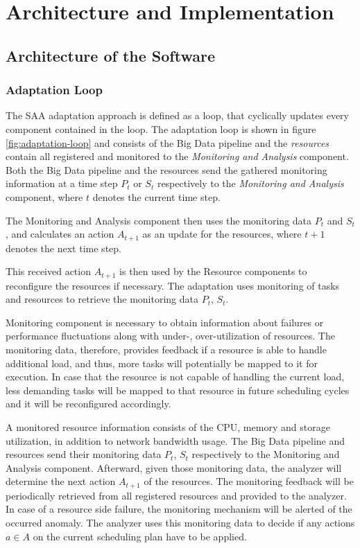 \chapter{Architecture and Implementation}
\label{ch:architecture-and-implementation}

\section{Architecture of the Software}

  \subsection{Adaptation Loop}


  The SAA adaptation approach is defined as a loop, that cyclically updates every component contained in the loop.
  The adaptation loop is shown in figure \ref{fig:adaptation-loop} and consists of the Big Data pipeline and the \emph{resources} contain all registered and monitored to the \emph{Monitoring and Analysis} component. 
  Both the Big Data pipeline and the resources send the gathered monitoring information at a time step $P_t$ or $S_t$ respectively to the \emph{Monitoring and Analysis} component, where $t$ denotes the current time step.

  The Monitoring and Analysis component then uses the monitoring data $P_t$ and $S_t$, and calculates an action $A_{t+1}$ as an update for the resources, where $t+1$ denotes the next time step.
  
  This received action $A_{t+1}$ is then used by the Resource components to reconfigure the resources if necessary.
  The adaptation uses monitoring of tasks and resources to retrieve the monitoring data $P_t$, $S_t$.
  
  Monitoring component is necessary to obtain information about failures or performance fluctuations along with under-, over-utilization of resources.
  The monitoring data, therefore, provides feedback if a resource is able to handle additional load, and thus, more tasks will potentially be mapped to it for execution. 
  In case that the resource is not capable of handling the current load, less demanding tasks will be mapped to that resource in future scheduling cycles and it will be reconfigured accordingly.

  A monitored resource information consists of the CPU, memory and storage utilization, in addition to network bandwidth usage.
  The Big Data pipeline and resources send their monitoring data $P_t$, $S_t$ respectively to the Monitoring and Analysis component.
  Afterward, given those monitoring data, the analyzer will determine the next action $A_{t+1}$ of the resources.
  The monitoring feedback will be periodically retrieved from all registered resources and provided to the analyzer.
  In case of a resource side failure, the monitoring mechanism will be alerted of the occurred anomaly.  
  The analyzer uses this monitoring data to decide if any actions $a \in A$ on the current scheduling plan have to be applied.
  
